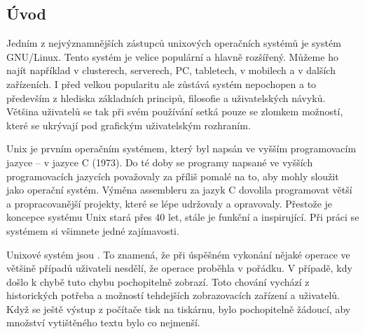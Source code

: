 \documentclass{article}
\begin{document}
\subsection{Úvod}
Jedním z nejvýznamnějších zástupců unixových operačních systémů je systém GNU/Linux. Tento systém je velice populární a hlavně rozšířený. Můžeme ho
najít například v clusterech, serverech, PC, tabletech, v mobilech a v dalších zařízeních. I před velkou popularitu ale zůstává systém nepochopen a to
především z hlediska základních principů, filosofie a uživatelských návyků. Většina  uživatelů se tak při svém používání setká pouze se zlomkem možností, které se ukrývají pod grafickým uživatelským rozhraním. 

Unix je prvním operačním systémem, který byl napsán ve vyšším programovacím jazyce -- v jazyce C (1973). Do té doby se programy napsané ve vyšších programovacích jazycích považovaly za příliš pomalé na to, aby mohly sloužit jako operační systém. Výměna assembleru za jazyk C dovolila programovat větší a propracovanější projekty, které se lépe udržovaly a opravovaly. Přestože je koncepce systému Unix stará přes 40 let, stále je funkční a inspirující. Při práci se systémem si všimnete jedné zajímavosti.

Unixové systém jsou . To znamená, že při úspěšném vykonání nějaké operace ve většině případů uživateli nesdělí, že operace proběhla v pořádku. V případě, kdy došlo k chybě tuto chybu pochopitelně zobrazí. Toto chování vychází z historických potřeba a možností tehdejších zobrazovacích zařízení a uživatelů. Když se ještě výstup z počítače tisk na tiskárnu, bylo pochopitelně žádoucí, aby množství vytištěného textu bylo co nejmenší.
\end{document}
